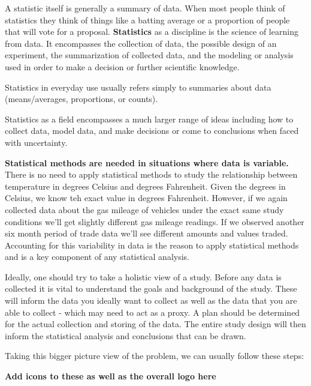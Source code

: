 \documentclass[
]{book}
\theoremstyle{definition}
\theoremstyle{definition}
\theoremstyle{definition}
\theoremstyle{remark}
\let\BeginKnitrBlock\begin \let\EndKnitrBlock\end
\begin{document}
A statistic itself is generally a summary of data. When most people think of statistics they think of things like a batting average or a proportion of people that will vote for a proposal. \textbf{Statistics} as a discipline is the science of learning from data. It encompasses the collection of data, the possible design of an experiment, the summarization of collected data, and the modeling or analysis used in order to make a decision or further scientific knowledge.

\BeginKnitrBlock{definition}
Statistics in everyday use usually refers simply to summaries about data (means/averages, proportions, or counts).

Statistics as a field encompasses a much larger range of ideas including how to collect data, model data, and make decisions or come to conclusions when faced with uncertainty.
\EndKnitrBlock{definition}

\textbf{Statistical methods are needed in situations where data is variable.} There is no need to apply statistical methods to study the relationship between temperature in degrees Celsius and degrees Fahrenheit. Given the degrees in Celsius, we know teh exact value in degrees Fahrenheit. However, if we again collected data about the gas mileage of vehicles under the exact same study conditions we'll get slightly different gas mileage readings. If we observed another six month period of trade data we'll see different amounts and values traded. Accounting for this variability in data is the reason to apply statistical methods and is a key component of any statistical analysis.

Ideally, one should try to take a holistic view of a study. Before any data is collected it is vital to understand the goals and background of the study. These will inform the data you ideally want to collect as well as the data that you are able to collect - which may need to act as a proxy. A plan should be determined for the actual collection and storing of the data. The entire study design will then inform the statistical analysis and conclusions that can be drawn.

Taking this bigger picture view of the problem, we can usually follow these steps:

\textbf{Add icons to these as well as the overall logo here }
\end{document}
